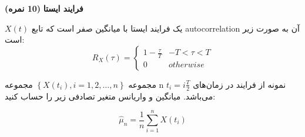 \Large \textbf{فرایند ایستا}
\large \textbf{(10 نمره)}

\normalsize \vspace{0.5cm}

$X\left( t \right)$
یک فرایند ایستا با میانگین صفر است که تابع autocorrelation آن به صورت زیر است:
$$
{R_X}\left( \tau  \right) = \left\{ {\begin{array}{*{20}{c}}
		{1 - \frac{\tau }{T}}&{ - T < \tau  < T}\\
		0&{otherwise}
\end{array}} \right.
$$

مجموعه
$\left\{ {X\left( {{t_i}} \right),i = 1,2, \ldots ,n} \right\}$
مجموعه n نمونه از فرایند در زمان‌های
${t_i} = i\frac{T}{2}$
می‌باشد. میانگین و واریانس متغیر تصادفی زیر را حساب کنید:

$$
{{\hat \mu }_n} = \frac{1}{n}\sum\limits_{i = 1}^n {X\left( {{t_i}} \right)}
$$